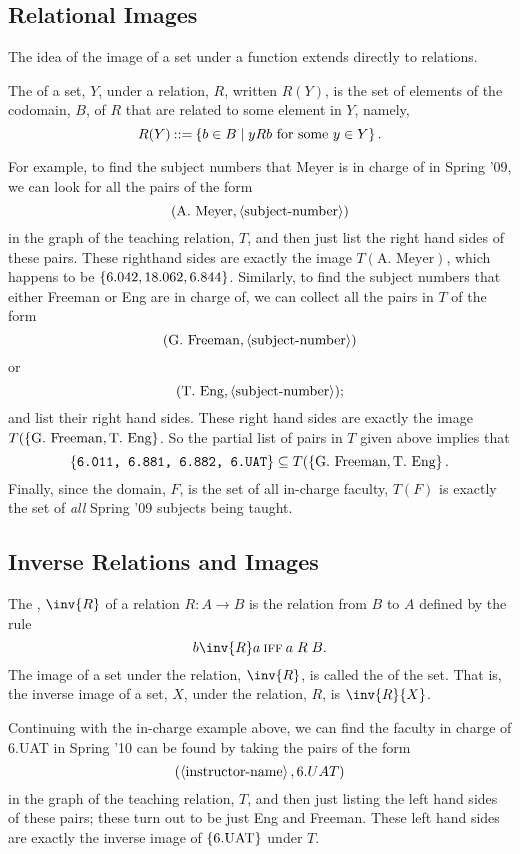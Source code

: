 \subsection{Relational Images}
The idea of the image of a set under a function extends directly to
relations.

\begin{definition}
The  of a set, $Y$, under a relation, $R$, written $R(Y)$, is the
set of elements of the codomain, $B$, of $R$ that are related to some element in
$Y$, namely,
\[
R(Y) \mathbin{::=} \left\{b \in B \mid yRb \text{ for some } y \in Y\right\}.
\]
\end{definition}

For example, to find the subject numbers that Meyer is in
charge of in Spring '09, we can look for all the pairs of the form
\[
(\text{A. Meyer}, \left\langle\text{subject-number}\right\rangle)
\]
in the graph of the teaching relation, $T$, and then just list the
right hand sides of these pairs.  These righthand sides are exactly the image
$T(\text{A. Meyer})$, which happens to be $\left\{6.042, 18.062, 6.844\right\}$.
Similarly, to find the subject numbers that either Freeman or Eng are
in charge of, we can collect all the pairs in $T$ of the form
\[
(\text{G. Freeman}, \left\langle\text{subject-number}\right\rangle)
\]
or
\[
(\text{T. Eng}, \left\langle\text{subject-number}\right\rangle);
\]
and list their right hand sides.  These right hand sides are exactly the image
$T(\left\{\text{G. Freeman}, \text{T. Eng}\right\}$.  So the partial list
of pairs in $T$ given above implies that
\[
\left\{\texttt{6.011, 6.881, 6.882, 6.UAT}\right\} \subseteq T(\left\{\text{G. Freeman}, \text{T. Eng}\right\}.
\]
Finally, since the domain, $F$, is the set of all in-charge faculty,
$T(F)$ is exactly the set of \emph{all} Spring '09 subjects being
taught.

\subsection{Inverse Relations and Images}

\begin{definition}
The , $\inv{R}$ of a relation $R: A \to B$ is the
relation from $B$ to $A$ defined by the rule
\[
b \inv{R} a \QIFF a \mrel{R} B.
\]
The image of a set under the relation, $\inv{R}$, is called
the  of the set.  That is, the inverse image of a
set, $X$, under the relation, $R$, is $\inv{R}{X}$.
\end{definition}

Continuing with the in-charge example above, we can find the faculty
in charge of 6.UAT in Spring '10 can be found by taking the pairs of
the form
\[
(\left\langle\text{instructor-name}\right\rangle, 6.UAT)
\]
in the graph of the teaching relation, $T$, and then just listing the
left hand sides of these pairs; these turn out to be just Eng and
Freeman.  These left hand sides are exactly the inverse image of
$\left\{\text{6.UAT}\right\}$ under $T$.

